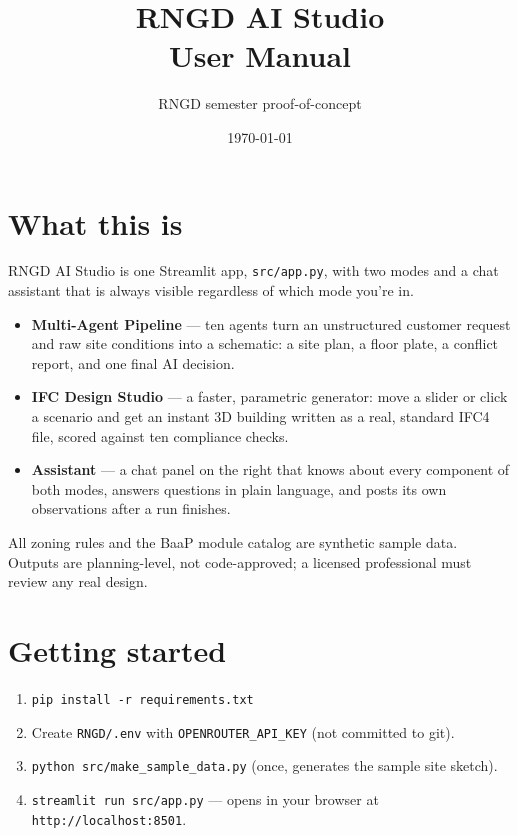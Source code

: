 \documentclass[11pt]{article}
\title{RNGD AI Studio\\\large User Manual}
\author{RNGD semester proof-of-concept}
\date{\today}
\begin{document}
\maketitle
\tableofcontents

\section{What this is}
RNGD AI Studio is one Streamlit app, \texttt{src/app.py}, with two modes and a chat assistant that is always
visible regardless of which mode you're in.

\begin{itemize}
\item \textbf{Multi-Agent Pipeline} — ten agents turn an unstructured customer request and raw site conditions
into a schematic: a site plan, a floor plate, a conflict report, and one final AI decision.
\item \textbf{IFC Design Studio} — a faster, parametric generator: move a slider or click a scenario and get an
instant 3D building written as a real, standard IFC4 file, scored against ten compliance checks.
\item \textbf{Assistant} — a chat panel on the right that knows about every component of both modes, answers
questions in plain language, and posts its own observations after a run finishes.
\end{itemize}
All zoning rules and the BaaP module catalog are synthetic sample data. Outputs are planning-level, not
code-approved; a licensed professional must review any real design.

\section{Getting started}
\begin{enumerate}[nosep]
\item \texttt{pip install -r requirements.txt}
\item Create \texttt{RNGD/.env} with \texttt{OPENROUTER\_API\_KEY} (not committed to git).
\item \texttt{python src/make\_sample\_data.py} (once, generates the sample site sketch).
\item \texttt{streamlit run src/app.py} — opens in your browser at \texttt{http://localhost:8501}.
\end{enumerate}
\end{document}
